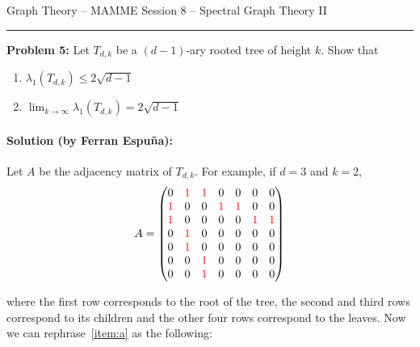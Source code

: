 \documentclass{amsart}
\theoremstyle{plain}
\theoremstyle{definition}
\begin{document}
    {\Large Graph Theory -- MAMME}
    {\Large Session 8 -- Spectral Graph Theory II}

    \vspace{0.5cm}

    \hrule

    \vspace{0.5cm}

    \noindent \textbf{Problem 5:}
    Let $T_{d, k}$ be a $(d-1)$-ary rooted tree of height $k$.
    Show that

    \begin{enumerate}[label=(\alph*)]
        \item $\lambda_1(T_{d, k}) \leq 2 \sqrt{d - 1}$ \label{item:a}
        \item $\lim_{k \to \infty} \lambda_1(T_{d, k}) = 2 \sqrt{d - 1}$ \label{item:b}
    \end{enumerate}


    \paragraph{\textbf{Solution (by Ferran Espuña):}}
    Let $A$ be the adjacency matrix of $T_{d, k}$.
    For example, if $d = 3$ and $k = 2$,
    \[A = \begin{pmatrix}
        0  & \color{red} 1  & \color{red} 1  &  0  &  0  &  0  &  0 \\
        \color{red} 1  &  0  &  0  & \color{red} 1  & \color{red} 1  &  0  &  0 \\
        \color{red} 1  &  0  &  0  &  0  &  0  & \color{red} 1  & \color{red} 1 \\
        0  & \color{red} 1  &  0  &  0  &  0  &  0  &  0 \\
        0  & \color{red} 1  &  0  &  0  &  0  &  0  &  0 \\
        0  &  0  & \color{red} 1  &  0  &  0  &  0  &  0 \\
        0  &  0  & \color{red} 1  &  0  &  0  &  0  &  0
    \end{pmatrix}
    \]

    where the first row corresponds to the root of the tree,
    the second and third rows correspond to its children and the other four rows correspond to the leaves.
    Now we can rephrase~\ref{item:a} as the following:
\end{document}
